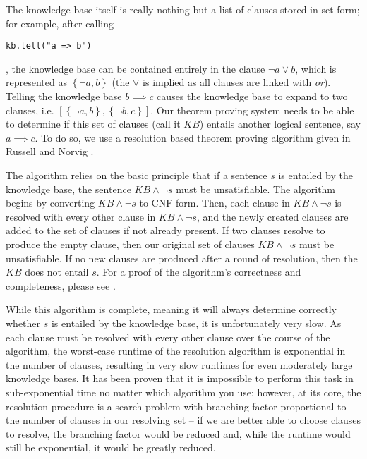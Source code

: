 \documentclass[english]{article}
\begin{document}
The knowledge base itself is really nothing but a list of clauses
stored in set form; for example, after calling
\begin{lstlisting}
kb.tell("a => b")
\end{lstlisting}
 , the knowledge base can be contained entirely in the clause $\lnot a\lor b$,
which is represented as $\left\{ \lnot a,b\right\} $ (the $\lor$
is implied as all clauses are linked with \emph{or}). Telling the
knowledge base $b\implies c$ causes the knowledge base to expand
to two clauses, i.e. $\left[\left\{ \lnot a,b\right\} ,\left\{ \lnot b,c\right\} \right]$.
Our theorem proving system needs to be able to determine if this set
of clauses (call it $KB$) entails another logical sentence, say $a\implies c$.
To do so, we use a resolution based theorem proving algorithm given
in Russell and Norvig \cite{RussellNorvigAI}. 

The algorithm relies on the basic principle that if a sentence $s$
is entailed by the knowledge base, the sentence $KB\land\lnot s$
must be unsatisfiable. The algorithm begins by converting $KB\land\lnot s$
to CNF form. Then, each clause in $KB\land\lnot s$ is resolved with
every other clause in $KB\land\lnot s$, and the newly created clauses
are added to the set of clauses if not already present. If two clauses
resolve to produce the empty clause, then our original set of clauses
$KB\land\lnot s$ must be unsatisfiable. If no new clauses are produced
after a round of resolution, then the $KB$ does not entail $s$.
For a proof of the algorithm's correctness and completeness, please
see \cite{RussellNorvigAI}. 

While this algorithm is complete, meaning it will always determine
correctly whether $s$ is entailed by the knowledge base, it is unfortunately
very slow. As each clause must be resolved with every other clause
over the course of the algorithm, the worst-case runtime of the resolution
algorithm is exponential in the number of clauses, resulting in very
slow runtimes for even moderately large knowledge bases. It has been
proven \cite{Cook:TheoremProvingComplexity} that it is impossible
to perform this task in sub-exponential time no matter which algorithm
you use; however, at its core, the resolution procedure is a search
problem with branching factor proportional to the number of clauses
in our resolving set -- if we are better able to choose clauses to
resolve, the branching factor would be reduced and, while the runtime
would still be exponential, it would be greatly reduced.
\end{document}
